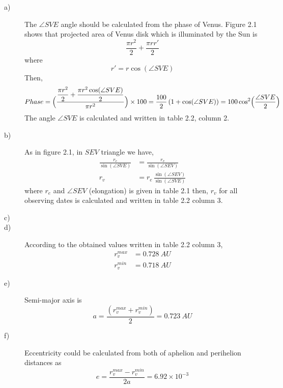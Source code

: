 \begin{description}
\item[a)]
The $\angle SVE$ angle should be calculated from the phase of Venus. Figure 2.1 shows that
projected area of Venus disk which is illuminated by the Sun is
\[
\frac{\pi r^2}{2} + \frac{\pi r r'}{2}
\]
where
\[
r' = r\cos(\angle SVE)
\]
Then,
\[
Phase = \Bigl(\frac{\dfrac{\pi r^2}{2} + \dfrac{\pi r^2\cos(\angle SVE)}{2}}{\pi r^2}\Bigr)
\times 100
= \frac{100}{2}\,(1 + \cos(\angle SVE)) = 100\cos^2\Bigl(\frac{\angle SVE}{2}\Bigr)
\]
The angle $\angle SVE$ is calculated and written in table 2.2, column 2.

\item[b)]
As in figure 2.1, in $SEV$ triangle we have,
\begin{align*}
\frac{r_e}{\sin(\angle SVE)} &= \frac{r_v}{\sin(\angle SEV)}\\
r_v &= r_e\,\frac{\sin(\angle SEV)}{\sin(\angle SVE)}
\end{align*}
where $r_e$ and $\angle SEV$ (elongation) is given in table 2.1 then, $r_v$ for all observing
dates is calculated and written in table 2.2 column 3.

\item[c)]

\item[d)]
According to the obtained values written in table 2.2 column 3,
\begin{align*}
r_v^{max} &= 0.728\ AU\\
r_v^{min} &= 0.718\ AU
\end{align*}

\item[e)]
Semi-major axis is
\[
a = \frac{(r_v^{max} + r_v^{min})}{2} = 0.723\ AU
\]

\item[f)]
Eccentricity could be calculated from both of aphelion and perihelion distances as
\[
e = \frac{r_v^{max} - r_v^{min}}{2a} = 6.92\times10^{-3}
\]
\end{description}

